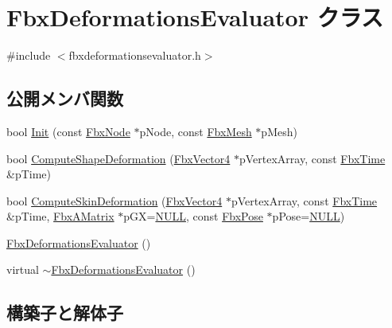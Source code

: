 \hypertarget{class_fbx_deformations_evaluator}{}\section{Fbx\+Deformations\+Evaluator クラス}
\label{class_fbx_deformations_evaluator}


{\ttfamily \#include $<$fbxdeformationsevaluator.\+h$>$}

\subsection*{公開メンバ関数}
\begin{DoxyCompactItemize}
\item 
bool \hyperlink{class_fbx_deformations_evaluator_aab3ae3fd2e05c1f34d19940030bd94ed}{Init} (const \hyperlink{class_fbx_node}{Fbx\+Node} $\ast$p\+Node, const \hyperlink{class_fbx_mesh}{Fbx\+Mesh} $\ast$p\+Mesh)
\item 
bool \hyperlink{class_fbx_deformations_evaluator_a7f2053ca983b26ba4991c71663b25778}{Compute\+Shape\+Deformation} (\hyperlink{class_fbx_vector4}{Fbx\+Vector4} $\ast$p\+Vertex\+Array, const \hyperlink{class_fbx_time}{Fbx\+Time} \&p\+Time)
\item 
bool \hyperlink{class_fbx_deformations_evaluator_a0bd5a2a85b36ff78be4739de7cc9918e}{Compute\+Skin\+Deformation} (\hyperlink{class_fbx_vector4}{Fbx\+Vector4} $\ast$p\+Vertex\+Array, const \hyperlink{class_fbx_time}{Fbx\+Time} \&p\+Time, \hyperlink{class_fbx_a_matrix}{Fbx\+A\+Matrix} $\ast$p\+GX=\hyperlink{fbxarch_8h_a070d2ce7b6bb7e5c05602aa8c308d0c4}{N\+U\+LL}, const \hyperlink{class_fbx_pose}{Fbx\+Pose} $\ast$p\+Pose=\hyperlink{fbxarch_8h_a070d2ce7b6bb7e5c05602aa8c308d0c4}{N\+U\+LL})
\item 
\hyperlink{class_fbx_deformations_evaluator_a58c875ccc032e63839063f2866f35d46}{Fbx\+Deformations\+Evaluator} ()
\item 
virtual \hyperlink{class_fbx_deformations_evaluator_a1bcc75f8ee488dbddc55456292f227b3}{$\sim$\+Fbx\+Deformations\+Evaluator} ()
\end{DoxyCompactItemize}


\subsection{構築子と解体子}
\mbox{\label{class_fbx_deformations_evaluator_a58c875ccc032e63839063f2866f35d46}} 
